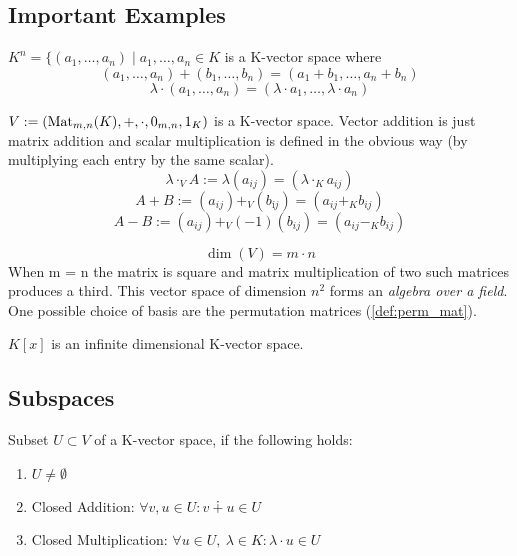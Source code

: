 \subsection{Important Examples}
\begin{example}
   \(K^n = \{(a_1, \ldots, a_n) \mid a_1, \ldots, a_n \in K\) is a K-vector space where
   \[(a_1, \ldots, a_n) + (b_1, \ldots, b_n) = (a_1 + b_1, \ldots, a_n + b_n)\]
   \[\lambda \cdot (a_1, \ldots, a_n) = (\lambda \cdot a_1, \ldots, \lambda \cdot a_n)\]
\end{example}

\begin{example}
   \(V := (\operatorname{Mat}_{m,n}(K), +, \cdot, 0_{m,n}, 1_K)\) is a K-vector space.
   Vector addition is just matrix addition and scalar multiplication is defined in the obvious way (by multiplying each entry by the same scalar).
   \[\lambda \cdot_V A := \lambda (a_{ij}) = (\lambda \cdot_K a_{ij})\]
   \[A + B := (a_{ij}) +_V (b_{íj}) = (a_{ij} +_K b_{ij})\]
   \[A - B := (a_{ij}) +_V (-1)(b_{ij}) = (a_{ij} -_K b_{ij})\]

   \[\dim(V) = m \cdot n\]
   When m = n the matrix is square and matrix multiplication of two such matrices produces a third.
   This vector space of dimension \(n^2\) forms an \textit{algebra over a field}.
   One possible choice of basis are the permutation matrices (\ref{def:perm_mat}).
\end{example}

\begin{example}
   \(K[x]\) is an infinite dimensional K-vector space.
\end{example}

\subsection{Subspaces}
\begin{definition}\label{def:vector_subspace}
   Subset \(U \subset V\) of a K-vector space, if the following holds:

   \begin{enumerate}[label=\roman*, align=Center]
      \item \(U \neq \emptyset\)
      \item Closed Addition: \(\forall v, u \in U: v \dotplus u \in U\)
      \item Closed Multiplication: \(\forall u \in U,~\lambda \in K: \lambda \cdot u \in U\)
   \end{enumerate}
\end{definition}

